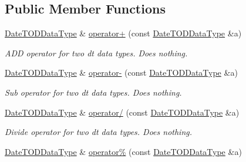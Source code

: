 \subsection*{Public Member Functions}
\begin{DoxyCompactItemize}
\item 
\hyperlink{structpc__emulator_1_1DateTODDataType}{Date\+T\+O\+D\+Data\+Type} \& \hyperlink{structpc__emulator_1_1DateTODDataType_ab10d6001d2511343ffdfccf674b40905}{operator+} (const \hyperlink{structpc__emulator_1_1DateTODDataType}{Date\+T\+O\+D\+Data\+Type} \&a)\hypertarget{structpc__emulator_1_1DateTODDataType_ab10d6001d2511343ffdfccf674b40905}{}\label{structpc__emulator_1_1DateTODDataType_ab10d6001d2511343ffdfccf674b40905}

\begin{DoxyCompactList}\small\item\em A\+DD operator for two dt data types. Does nothing. \end{DoxyCompactList}\item 
\hyperlink{structpc__emulator_1_1DateTODDataType}{Date\+T\+O\+D\+Data\+Type} \& \hyperlink{structpc__emulator_1_1DateTODDataType_abc7b4516ccd3d9865961909bbffc6f26}{operator-\/} (const \hyperlink{structpc__emulator_1_1DateTODDataType}{Date\+T\+O\+D\+Data\+Type} \&a)\hypertarget{structpc__emulator_1_1DateTODDataType_abc7b4516ccd3d9865961909bbffc6f26}{}\label{structpc__emulator_1_1DateTODDataType_abc7b4516ccd3d9865961909bbffc6f26}

\begin{DoxyCompactList}\small\item\em Sub operator for two dt data types. Does nothing. \end{DoxyCompactList}\item 
\hyperlink{structpc__emulator_1_1DateTODDataType}{Date\+T\+O\+D\+Data\+Type} \& \hyperlink{structpc__emulator_1_1DateTODDataType_a17b7d54b77f6bd0a5644cc027c465384}{operator/} (const \hyperlink{structpc__emulator_1_1DateTODDataType}{Date\+T\+O\+D\+Data\+Type} \&a)\hypertarget{structpc__emulator_1_1DateTODDataType_a17b7d54b77f6bd0a5644cc027c465384}{}\label{structpc__emulator_1_1DateTODDataType_a17b7d54b77f6bd0a5644cc027c465384}

\begin{DoxyCompactList}\small\item\em Divide operator for two dt data types. Does nothing. \end{DoxyCompactList}\item 
\hyperlink{structpc__emulator_1_1DateTODDataType}{Date\+T\+O\+D\+Data\+Type} \& \hyperlink{structpc__emulator_1_1DateTODDataType_a6ac922d5104336741eb6c5fe262ca0b4}{operator\%} (const \hyperlink{structpc__emulator_1_1DateTODDataType}{Date\+T\+O\+D\+Data\+Type} \&a)\hypertarget{structpc__emulator_1_1DateTODDataType_a6ac922d5104336741eb6c5fe262ca0b4}{}\label{structpc__emulator_1_1DateTODDataType_a6ac922d5104336741eb6c5fe262ca0b4}


\end{DoxyCompactItemize}
